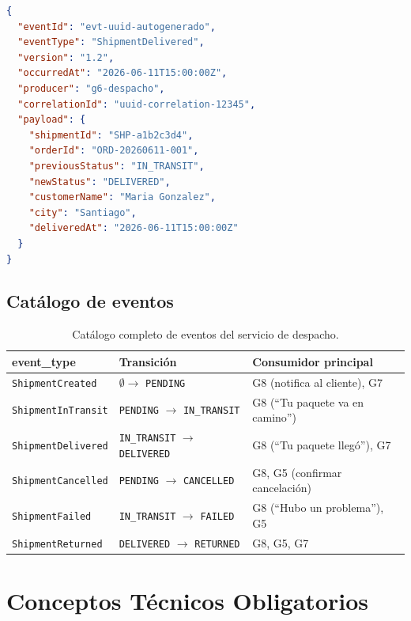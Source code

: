 \documentclass[11pt, a4paper]{article}
\begin{document}
\begin{lstlisting}[language=json]
{
  "eventId": "evt-uuid-autogenerado",
  "eventType": "ShipmentDelivered",
  "version": "1.2",
  "occurredAt": "2026-06-11T15:00:00Z",
  "producer": "g6-despacho",
  "correlationId": "uuid-correlation-12345",
  "payload": {
    "shipmentId": "SHP-a1b2c3d4",
    "orderId": "ORD-20260611-001",
    "previousStatus": "IN_TRANSIT",
    "newStatus": "DELIVERED",
    "customerName": "Maria Gonzalez",
    "city": "Santiago",
    "deliveredAt": "2026-06-11T15:00:00Z"
  }
}
\end{lstlisting}

\subsection{Catálogo de eventos}

\begin{table}[h!]
\centering
\renewcommand{\arraystretch}{1.3}
\begin{tabularx}{\textwidth}{l l X}
  \toprule
  \textbf{event\_type} & \textbf{Transición} & \textbf{Consumidor principal} \\
  \midrule
  \texttt{ShipmentCreated}    & $\emptyset \rightarrow$ \texttt{PENDING}     & G8 (notifica al cliente), G7 \\
  \texttt{ShipmentInTransit}  & \texttt{PENDING} $\rightarrow$ \texttt{IN\_TRANSIT}  & G8 (``Tu paquete va en camino'') \\
  \texttt{ShipmentDelivered}  & \texttt{IN\_TRANSIT} $\rightarrow$ \texttt{DELIVERED} & G8 (``Tu paquete llegó''), G7 \\
  \texttt{ShipmentCancelled}  & \texttt{PENDING} $\rightarrow$ \texttt{CANCELLED}    & G8, G5 (confirmar cancelación) \\
  \texttt{ShipmentFailed}     & \texttt{IN\_TRANSIT} $\rightarrow$ \texttt{FAILED}    & G8 (``Hubo un problema''), G5 \\
  \texttt{ShipmentReturned}   & \texttt{DELIVERED} $\rightarrow$ \texttt{RETURNED}    & G8, G5, G7 \\
  \bottomrule
\end{tabularx}
\caption{Catálogo completo de eventos del servicio de despacho.}
\end{table}


\section{Conceptos Técnicos Obligatorios}
\end{document}
